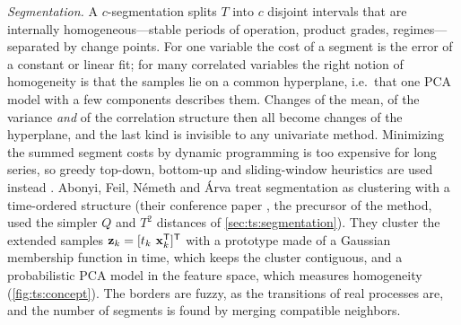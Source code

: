 \emph{Segmentation.} A $c$-segmentation splits $T$ into $c$ disjoint intervals that are internally homogeneous---stable periods of operation, product grades, regimes---separated by change points. For one variable the cost of a segment is the error of a constant or linear fit; for many correlated variables the right notion of homogeneity is that the samples lie on a common hyperplane, i.e.\ that one PCA model with a few components describes them. Changes of the mean, of the variance \emph{and} of the correlation structure then all become changes of the hyperplane, and the last kind is invisible to any univariate method. Minimizing the summed segment costs by dynamic programming is too expensive for long series, so greedy top-down, bottom-up and sliding-window heuristics are used instead \cite{keogh:2001:online,himberg:2001:segmentation}. Abonyi, Feil, N\'emeth and \'Arva \cite{abonyi:2005:segmentation} treat segmentation as clustering with a time-ordered structure (their conference paper \cite{abonyi:2003:segmentation}, the precursor of the method, used the simpler $Q$ and $T^2$ distances of \cref{sec:ts:segmentation}). They cluster the extended samples $\mathbf{z}_k=[t_k\ \mathbf{x}_k^{\mathsf{T}}]^{\mathsf{T}}$ with a prototype made of a Gaussian membership function in time, which keeps the cluster contiguous, and a probabilistic PCA model in the feature space, which measures homogeneity (\cref{fig:ts:concept}). The borders are fuzzy, as the transitions of real processes are, and the number of segments is found by merging compatible neighbors.

